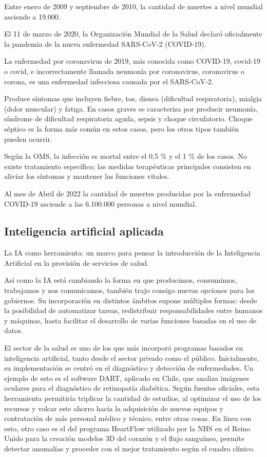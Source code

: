\documentclass[journal]{IEEEtran}
\begin{document}
Entre enero de 2009 y septiembre de 2010, la cantidad de muertes a nivel mundial asciende a 19.000\cite{h1n1-overview}.

El 11 de marzo de 2020, la Organización Mundial de la Salud declaró oficialmente la pandemia de la nueva enfermedad SARS-CoV-2 (COVID-19).

La enfermedad por coronavirus de 2019, más conocida como COVID-19, covid-19 o covid, e incorrectamente llamada neumonía por coronavirus, coronavirus o corona, es una enfermedad infecciosa causada por el SARS-CoV-2.

Produce síntomas que incluyen fiebre, tos, disnea (dificultad respiratoria), mialgia (dolor muscular) y fatiga. En casos graves se caracteriza por producir neumonía, síndrome de dificultad respiratoria aguda, sepsis y choque circulatorio. Choque séptico es la forma más común en estos casos, pero los otros tipos también pueden ocurrir.

Según la OMS, la infección es mortal entre el 0,5 \% y el 1 \% de los casos. No existe tratamiento específico; las medidas terapéuticas principales consisten en aliviar los síntomas y mantener las funciones vitales.

Al mes de Abril de 2022 la cantidad de muertes producidas por la enfermedad COVID-19 asciende a las 6.100.000 personas a nivel mundial\cite{hopkins-map}.

\subsection{Inteligencia artificial aplicada}
La IA como herramienta: un marco para pensar la introducción de la Inteligencia Artificial en la provisión de servicios de salud.

Así como la IA está cambiando la forma en que producimos, consumimos, trabajamos y nos comunicamos, también trajo consigo nuevas opciones para los gobiernos. Su incorporación en distintos ámbitos supone múltiples formas: desde la posibilidad de automatizar tareas, redistribuir responsabilidades entre humanos y máquinas, hasta facilitar el desarrollo de varias funciones basadas en el uso de datos.

El sector de la salud es uno de los que más incorporó programas basados en inteligencia artificial, tanto desde el sector privado como el público. Inicialmente, su implementación se centró en el diagnóstico y detección de enfermedades. Un ejemplo de esto es el software DART, aplicado en Chile, que analiza imágenes oculares para el diagnóstico de retinopatía diabética. Según fuentes oficiales, esta herramienta permitiría triplicar la cantidad de estudios, al optimizar el uso de los recursos y volcar este ahorro hacia la adquisición de nuevos equipos y contratación de más personal médico y técnico, entre otras cosas. En línea con esto, otro caso es el del programa HeartFlow utilizado por la NHS en el Reino Unido para la creación modelos 3D del corazón y el flujo sanguíneo, permite detectar anomalías y proceder con el mejor tratamiento según el cuadro clínico.
\end{document}
